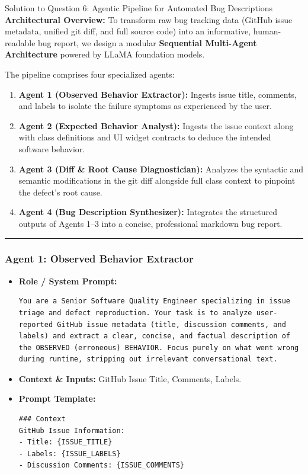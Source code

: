 \documentclass[11pt,a4paper]{article}
\begin{document}
\begin{solutionbox}{Solution to Question 6: Agentic Pipeline for Automated Bug Descriptions}
\textbf{Architectural Overview:}
To transform raw bug tracking data (GitHub issue metadata, unified git diff, and full source code) into an informative, human-readable bug report, we design a modular \textbf{Sequential Multi-Agent Architecture} powered by LLaMA foundation models.

The pipeline comprises four specialized agents:
\begin{enumerate}[label=\arabic*.]
    \item \textbf{Agent 1 (Observed Behavior Extractor):} Ingests issue title, comments, and labels to isolate the failure symptoms as experienced by the user.
    \item \textbf{Agent 2 (Expected Behavior Analyst):} Ingests the issue context along with class definitions and UI widget contracts to deduce the intended software behavior.
    \item \textbf{Agent 3 (Diff \& Root Cause Diagnostician):} Analyzes the syntactic and semantic modifications in the git diff alongside full class context to pinpoint the defect's root cause.
    \item \textbf{Agent 4 (Bug Description Synthesizer):} Integrates the structured outputs of Agents 1--3 into a concise, professional markdown bug report.
\end{enumerate}

\vspace{6pt}
\hrule
\vspace{6pt}

\subsubsection*{Agent 1: Observed Behavior Extractor}
\begin{itemize}[leftmargin=1.5em]
    \item \textbf{Role / System Prompt:}
\begin{lstlisting}[style=diffstyle]
You are a Senior Software Quality Engineer specializing in issue triage and defect reproduction. Your task is to analyze user-reported GitHub issue metadata (title, discussion comments, and labels) and extract a clear, concise, and factual description of the OBSERVED (erroneous) BEHAVIOR. Focus purely on what went wrong during runtime, stripping out irrelevant conversational text.
\end{lstlisting}
    \item \textbf{Context \& Inputs:} GitHub Issue Title, Comments, Labels.
    \item \textbf{Prompt Template:}
\begin{lstlisting}[style=diffstyle]
### Context
GitHub Issue Information:
- Title: {ISSUE_TITLE}
- Labels: {ISSUE_LABELS}
- Discussion Comments: {ISSUE_COMMENTS}


\end{lstlisting}
\end{itemize}
\end{solutionbox}
\end{document}
